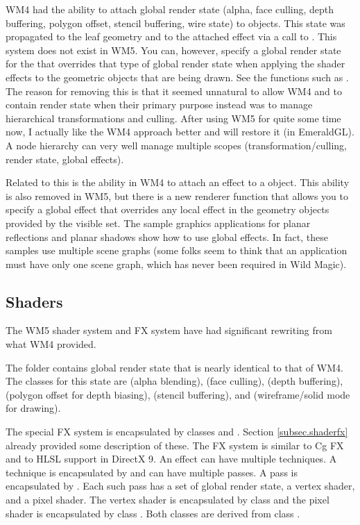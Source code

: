 \documentclass{article}
\begin{document}
WM4 had the ability to attach global render state (alpha, face culling,
depth buffering, polygon offset, stencil buffering, wire state) to 
objects.  This state was propagated to the leaf geometry and to the attached
effect via a call to .  This system does not exist in WM5.
You can, however, specify a global render state for the 
that overrides that type of global render state when applying the shader
effects to the geometric objects that are being drawn.  See the
 functions such as .  The reason
for removing this is that it seemed unnatural to allow WM4  and
 to contain render state when their primary purpose instead was to
manage hierarchical transformations and culling.  After using WM5 for quite
some time now, I actually like the WM4 approach better and will restore it
(in EmeraldGL).  A node hierarchy can very well manage multiple scopes
(transformation/culling, render state, global effects).

Related to this is the ability in WM4 to attach an effect to a 
object.  This ability is also removed in WM5, but there is a new
renderer  function that allows you to specify a global effect
that overrides any local effect in the geometry objects provided by the
visible set.  The sample graphics applications for planar reflections and
planar shadows show how to use global effects.  In fact, these samples use
multiple scene graphs (some folks seem to think that an application must
have only one scene graph, which has never been required in Wild Magic).

\subsection{Shaders}

The WM5 shader system and FX system have had significant rewriting from what
WM4 provided.

The  folder contains global render state that is
nearly identical to that of WM4.  The classes for this state are
 (alpha blending),  (face culling),
 (depth buffering),  (polygon offset
for depth biasing),  (stencil buffering), and
 (wireframe/solid mode for drawing).

The special FX system is encapsulated by classes  and
.  Section \ref{subsec.shaderfx} already provided
some description of these.  The FX system is similar to Cg FX and to HLSL
support in DirectX 9.  An effect can have multiple techniques.  A technique
is encapsulated by  and can have multiple passes.
A pass is encapsulated by .  Each such pass has a set of
global render state, a vertex shader, and a pixel shader.  The vertex shader
is encapsulated by class  and the pixel shader is
encapsulated by class .  Both classes are derived from
class .
\end{document}

